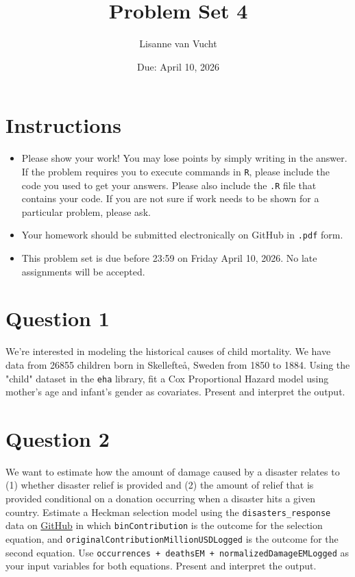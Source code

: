 \documentclass[12pt,letterpaper]{article}
\title{Problem Set 4}
\date{Due: April 10, 2026}
\author{Lisanne van Vucht}
\begin{document}
	\maketitle
	\section*{Instructions}
	\begin{itemize}
		\item Please show your work! You may lose points by simply writing in the answer. If the problem requires you to execute commands in \texttt{R}, please include the code you used to get your answers. Please also include the \texttt{.R} file that contains your code. If you are not sure if work needs to be shown for a particular problem, please ask.
		\item Your homework should be submitted electronically on GitHub in \texttt{.pdf} form.
		\item This problem set is due before 23:59 on Friday April 10, 2026. No late assignments will be accepted.
		
	\end{itemize}
	
	\vspace{.25cm}
	\section*{Question 1}
	\vspace{.25cm}
	\noindent We're interested in modeling the historical causes of child mortality. We have data from 26855 children born in Skellefteå, Sweden from 1850 to 1884. Using the "child" dataset in the \texttt{eha} library, fit a Cox Proportional Hazard model using mother's age and infant's gender as covariates. Present and interpret the output.
	
	
	
	\section*{Question 2}
	\vspace{.25cm}
	\noindent We want to estimate how the amount of damage caused by a disaster relates to (1) whether disaster relief is provided and (2) the amount of relief that is provided  conditional on a donation occurring when a disaster hits a given country. Estimate a Heckman selection model using the \texttt{disasters\_response} data on \href{https://raw.githubusercontent.com/ASDS-TCD/StatsII_2026/refs/heads/main/datasets/disaster_response.csv}{GitHub} in which \texttt{binContribution} is the outcome for the selection equation, and \texttt{originalContributionMillionUSDLogged} is the outcome for the second equation. Use \texttt{occurrences  + deathsEM + normalizedDamageEMLogged} as your input variables for both equations. Present and interpret the output.
	
\end{document}
